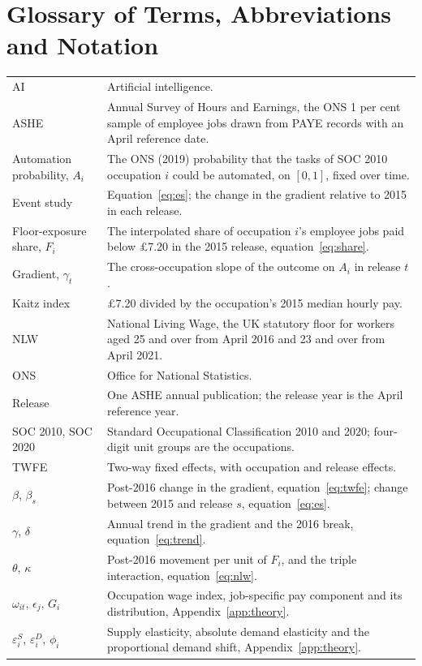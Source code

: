 \documentclass[12pt,leqno]{article}
\begin{document}
\section{Glossary of Terms, Abbreviations and Notation}\label{app:glossary}

\begin{small}
\begin{tabular}{p{}p{}}
\toprule
AI & Artificial intelligence. \\
ASHE & Annual Survey of Hours and Earnings, the ONS 1 per cent sample of employee jobs drawn from PAYE records with an April reference date. \\
Automation probability, $A_i$ & The ONS (2019) probability that the tasks of SOC 2010 occupation $i$ could be automated, on $[0,1]$, fixed over time. \\
Event study & Equation~\eqref{eq:es}; the change in the gradient relative to 2015 in each release. \\
Floor-exposure share, $F_i$ & The interpolated share of occupation $i$'s employee jobs paid below \pounds 7.20 in the 2015 release, equation~\eqref{eq:share}. \\
Gradient, $\gamma_t$ & The cross-occupation slope of the outcome on $A_i$ in release $t$. \\
Kaitz index & \pounds 7.20 divided by the occupation's 2015 median hourly pay. \\
NLW & National Living Wage, the UK statutory floor for workers aged 25 and over from April 2016 and 23 and over from April 2021. \\
ONS & Office for National Statistics. \\
Release & One ASHE annual publication; the release year is the April reference year. \\
SOC 2010, SOC 2020 & Standard Occupational Classification 2010 and 2020; four-digit unit groups are the occupations. \\
TWFE & Two-way fixed effects, with occupation and release effects. \\
$\beta$, $\beta_s$ & Post-2016 change in the gradient, equation~\eqref{eq:twfe}; change between 2015 and release $s$, equation~\eqref{eq:es}. \\
$\gamma$, $\delta$ & Annual trend in the gradient and the 2016 break, equation~\eqref{eq:trend}. \\
$\theta$, $\kappa$ & Post-2016 movement per unit of $F_i$, and the triple interaction, equation~\eqref{eq:nlw}. \\
$\omega_{it}$, $\epsilon_j$, $G_i$ & Occupation wage index, job-specific pay component and its distribution, Appendix~\ref{app:theory}. \\
$\varepsilon^{S}_i$, $\varepsilon^{D}_i$, $\phi_i$ & Supply elasticity, absolute demand elasticity and the proportional demand shift, Appendix~\ref{app:theory}. \\
\bottomrule
\end{tabular}
\end{small}
\end{document}

